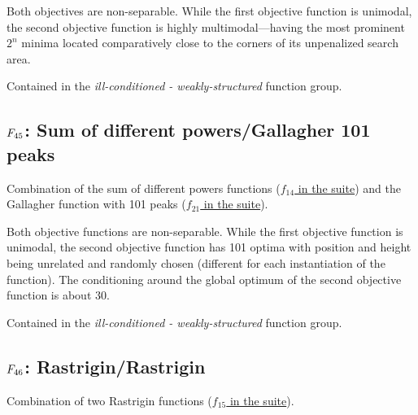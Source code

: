Both objectives are non-separable.
While the first objective function is unimodal,
the second objective function is highly multimodal---having the most
prominent \(2^n\) minima located comparatively close to the corners
of its unpenalized search area.

Contained in the \emph{ill-conditioned - weakly-structured} function group.



\subsection[\texorpdfstring{\protect\(F_{45}\protect\): Sum of different powers/Gallagher 101 peaks}{F45: Sum of different powers/Gallagher 101 peaks}]{\texorpdfstring{\protect\(F_{45}\protect\): Sum of different powers/Gallagher 101 peaks}{}}
\label{index:sum-of-different-powers-gallagher-101-peaks}\label{index:f45}
Combination of the sum of different powers functions
(\href{https://coco.gforge.inria.fr/downloads/download16.00/bbobdocfunctions.pdf\#page=70}{\(f_{14}\) in the \bbob suite}) and the Gallagher function with
101 peaks (\href{https://coco.gforge.inria.fr/downloads/download16.00/bbobdocfunctions.pdf\#page=105}{\(f_{21}\) in the \bbob suite}).

Both objective functions are non-separable.
While the first objective function is unimodal, the second objective function
has 101 optima with position and height being unrelated and randomly
chosen (different for each instantiation of the function). The
conditioning around the global optimum of the second objective function
is about 30.

Contained in the \emph{ill-conditioned - weakly-structured} function group.



\subsection[\texorpdfstring{\protect\(F_{46}\protect\): Rastrigin/Rastrigin}{F46: Rastrigin/Rastrigin}]{\texorpdfstring{\protect\(F_{46}\protect\): Rastrigin/Rastrigin}{}}
\label{index:rastrigin-rastrigin}\label{index:f46}
Combination of two Rastrigin functions
(\href{https://coco.gforge.inria.fr/downloads/download16.00/bbobdocfunctions.pdf\#page=75}{\(f_{15}\) in the \bbob suite}).

